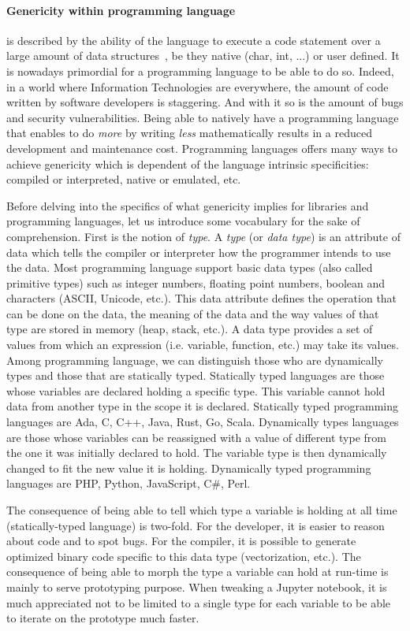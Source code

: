 \paragraph{Genericity within programming language} is described by the ability of the language to execute a code
statement over a large amount of data structures~\parencite{dehnert.1998.fundamentals}, be they native (char, int, ...)
or user defined. It is nowadays primordial for a programming language to be able to do so. Indeed, in a world where
Information Technologies are everywhere, the amount of code written by software developers is staggering. And with it so
is the amount of bugs and security vulnerabilities. Being able to natively have a programming language that enables to
do \emph{more} by writing \emph{less} mathematically results in a reduced development and maintenance cost. Programming
languages offers many ways to achieve genericity which is dependent of the language intrinsic specificities: compiled or
interpreted, native or emulated, etc.

Before delving into the specifics of what genericity implies for libraries and programming languages, let us introduce
some vocabulary for the sake of comprehension. First is the notion of \emph{type}. A \emph{type} (or \emph{data type})
is an attribute of data which tells the compiler or interpreter how the programmer intends to use the data. Most
programming language support basic data types (also called primitive types) such as integer numbers, floating point
numbers, boolean and characters (ASCII, Unicode, etc.). This data attribute defines the operation that can be done on
the data, the meaning of the data and the way values of that type are stored in memory (heap, stack, etc.). A data type
provides a set of values from which an expression (i.e. variable, function, etc.) may take its values. Among programming
language, we can distinguish those who are dynamically types and those that are statically typed. Statically typed
languages are those whose variables are declared holding a specific type. This variable cannot hold data from another
type in the scope it is declared. Statically typed programming languages are Ada, C, C++, Java, Rust, Go, Scala.
Dynamically types languages are those whose variables can be reassigned with a value of different type from the one it
was initially declared to hold. The variable type is then dynamically changed to fit the new value it is holding.
Dynamically typed programming languages are PHP, Python, JavaScript, C\#, Perl.

The consequence of being able to tell which type a variable is holding at all time (statically-typed language) is
two-fold. For the developer, it is easier to reason about code and to spot bugs. For the compiler, it is possible to
generate optimized binary code specific to this data type (vectorization, etc.). The consequence of being able to morph
the type a variable can hold at run-time is mainly to serve prototyping purpose. When tweaking a Jupyter notebook, it is
much appreciated not to be limited to a single type for each variable to be able to iterate on the prototype much
faster.

